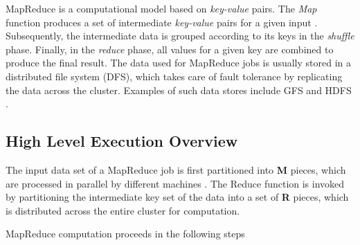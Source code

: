 MapReduce is a computational model based on \textit{key-value} pairs. The \textit{Map} function produces a set of intermediate \textit{key-value} pairs for a given input \cite{dean2008mapreduce}. Subsequently, the intermediate data is grouped according to its keys in the \textit{shuffle} phase. Finally, in the \textit{reduce} phase, all values for a given key are combined to produce the final result. The data used for MapReduce jobs is usually stored in a distributed file system (DFS), which takes care of fault tolerance by replicating the data across the cluster. Examples of such data stores include GFS \cite{ghemawat2003google} and HDFS \cite{borthakur2008hdfs}.

\subsection{High Level Execution Overview} \label{subsec:MROverview}

The input data set of a MapReduce job is first partitioned into \textbf{M} pieces, which are processed in parallel by different machines \cite{dean2008mapreduce}. The Reduce function is invoked by partitioning the intermediate key set of the data into a set of \textbf{R} pieces, which is distributed across the entire cluster for computation. 

MapReduce computation proceeds in the following steps

